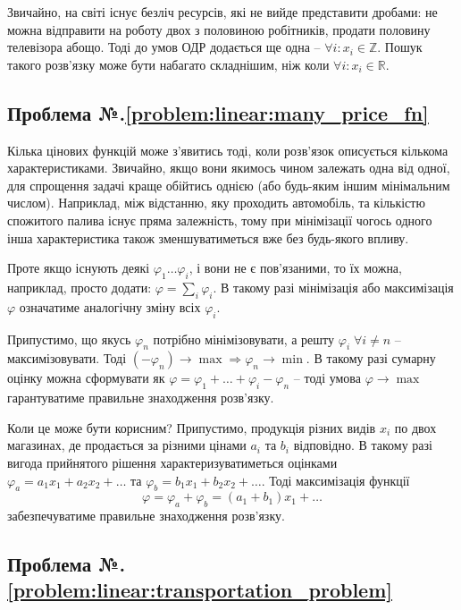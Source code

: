 \documentclass[\main/book.tex]{subfiles}
\begin{document}
Звичайно, на світі існує безліч ресурсів, які не вийде представити дробами: не можна відправити на роботу двох з половиною робітників, продати половину телевізора абощо. Тоді до умов ОДР додається ще одна -- $\forall i: x_i \in \mathbb{Z}$. Пошук такого розв'язку може бути набагато складнішим, ніж коли $\forall i: x_i \in \mathbb{R}$.

\subsection*{Проблема №.\ref{problem:linear:many_price_fn}}

Кілька цінових функцій може з'явитись тоді, коли розв'язок описується кількома характеристиками. Звичайно, якщо вони якимось чином залежать одна від одної, для спрощення задачі краще обійтись однією (або будь-яким іншим мінімальним числом). Наприклад, між відстанню, яку проходить автомобіль, та кількістю спожитого палива існує пряма залежність, тому при мінімізації чогось одного інша характеристика також зменшуватиметься вже без будь-якого впливу.

Проте якщо існують деякі $\varphi_1 \ldots \varphi_i$, і вони не є пов'язаними, то їх можна, наприклад, просто додати: $\varphi = \sum_i \varphi_i$. В такому разі мінімізація або максимізація $\varphi$ означатиме аналогічну зміну всіх $\varphi_i$.

Припустимо, що якусь $\varphi_n$ потрібно мінімізовувати, а решту $\varphi_i \; \forall {i \neq n}$ -- максимізовувати. Тоді $(-\varphi_n) \rightarrow \max \Rightarrow \varphi_n \rightarrow \min$. В такому разі сумарну оцінку можна сформувати як $\varphi = \varphi_1 + \ldots + \varphi_i - \varphi_n$ -- тоді умова $\varphi \rightarrow \max$ гарантуватиме правильне знаходження розв'язку.

Коли це може бути корисним? Припустимо, продукція різних видів $x_i$ по двох магазинах, де продається за різними цінами $a_i$ та $b_i$ відповідно. В такому разі \flqq{}вигода\frqq{} прийнятого рішення характеризуватиметься оцінками $\varphi_a = a_1 x_1 + a_2 x_2 + \ldots$ та $\varphi_b = b_1 x_1 + b_2 x_2 + \ldots$. Тоді максимізація функції $$\varphi = \varphi_a + \varphi_b = (a_1 + b_1) x_1 + \ldots$$ забезпечуватиме правильне знаходження розв'язку.

\subsection*{Проблема №.\ref{problem:linear:transportation_problem}}
\end{document}
